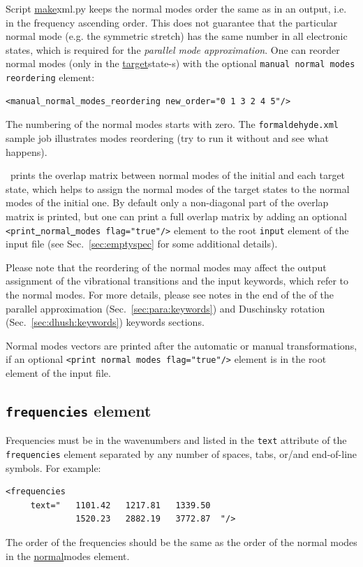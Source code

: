 \documentclass[11pt]{article}
\begin{document}
Script \ul{make}{xml.py} keeps the normal modes order the same as in an \ai output, i.e. in the frequency ascending order. 
This does not guarantee that the particular normal mode 
(e.g. the symmetric stretch) has the same number 
in all electronic states, which is required for the {\em parallel mode approximation}.
One can reorder normal modes (only in the \ul{target}{state}-s) with the optional 
{\tt manual normal modes reordering} element:
\begin{lstlisting}[frame=single,framerule=0pt]
  <manual_normal_modes_reordering new_order="0 1 3 2 4 5"/>
\end{lstlisting}
The numbering of the normal modes starts with zero. The \texttt{formaldehyde.xml} sample job
illustrates modes reordering (try to run it without and see what happens).

\ezFCF\ prints the overlap matrix between normal modes of the initial and each target state,
which helps to assign the normal modes of the target states to the normal modes of the initial one.
By default only a non-diagonal part of the overlap matrix is printed, 
but one can print a full overlap matrix by adding an optional {\tt <print\underline{~}normal\underline{~}modes flag="true"/>} 
element to the root {\tt input} element of the input file (see Sec.~\ref{sec:emptyspec} for some additional details).

Please note that the reordering of the normal modes may affect the output assignment of the vibrational transitions and
the input keywords, which refer to the normal modes. For more details, please see notes in the end of the  
of the parallel approximation (Sec.~\ref{sec:para:keywords}) 
and Duschinsky rotation (Sec.~\ref{sec:dhush:keywords}) keywords sections.

Normal modes vectors are printed after the automatic or manual transformations,
if an optional {\tt <print normal modes flag="true"/>} 
element is in the root element of the input file.

\subsection{\texttt{frequencies} element}
\label{sec:freq}

Frequencies must be in the wavenumbers and listed in the {\tt text} attribute of the {\tt frequencies} 
element separated by any number of spaces, tabs, or/and end-of-line symbols. For example:
\begin{lstlisting}[frame=single,framerule=0pt]
  <frequencies 
     text="   1101.42   1217.81   1339.50    
              1520.23   2882.19   3772.87  "/>
\end{lstlisting}
The order of the frequencies should be the same as the order of the normal modes in the \ul{normal}{modes} element.
\end{document}
